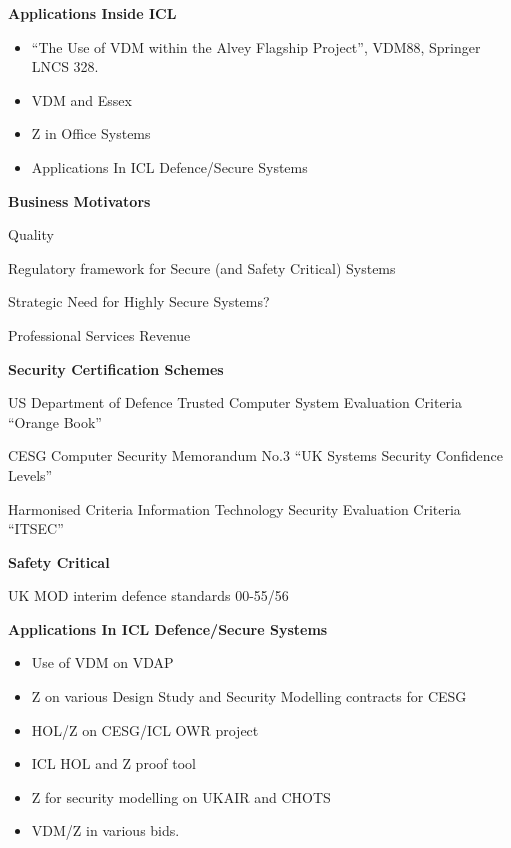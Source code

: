 \begin{slide}{}
\begin{center}
{\bf {Applications Inside ICL}}
\end{center}

\begin{itemize}
\item
``The Use of VDM within the Alvey Flagship Project'', VDM88, Springer LNCS 328.
\item
VDM and Essex
\item
Z in Office Systems
\item
Applications In ICL Defence/Secure Systems
\end{itemize}

\end{slide}

\begin{slide}{}
\begin{center}
{\bf Business Motivators}


Quality


Regulatory framework for
Secure (and Safety Critical) Systems


Strategic Need for Highly Secure Systems?


Professional Services Revenue

\end{center}
\end{slide}


\begin{slide}{}
\begin{center}
{\bf Security Certification Schemes}


US Department of Defence
Trusted Computer System
Evaluation Criteria
``Orange Book''

CESG Computer Security Memorandum No.3
``UK Systems Security Confidence Levels''

Harmonised Criteria
Information Technology Security
Evaluation Criteria
``ITSEC''

{\bf Safety Critical}

UK MOD
interim defence standards 00-55/56
\end{center}
\end{slide}

\begin{slide}{}

\begin{center}
{\bf {Applications In ICL Defence/Secure Systems}}
\end{center}

\begin{itemize}
\item
Use of VDM on VDAP
\item
Z on various Design Study and Security Modelling contracts for CESG
\item
HOL/Z on CESG/ICL OWR project
\item
ICL HOL and Z proof tool
\item
Z for security modelling on UKAIR and CHOTS
\item
VDM/Z in various bids. 
\end{itemize}

\end{slide}


